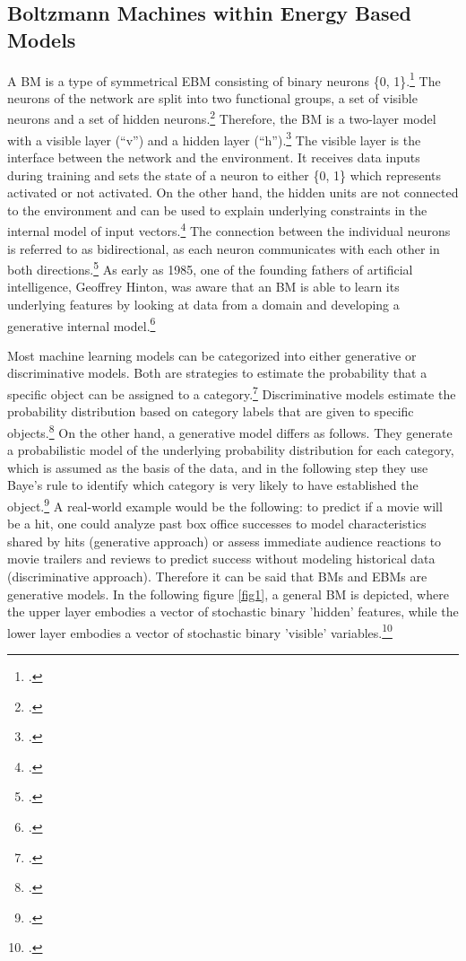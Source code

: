 \subsection{Boltzmann Machines within Energy Based Models}

A \ac{BM} is a type of symmetrical \ac{EBM} consisting of binary neurons \{0, 1\}.\footcite[cf.][260]{amariInformationGeometryBoltzmann1992}
The neurons of the network are split into two functional groups, a set of visible neurons and a set of hidden neurons.\footcite[cf.][154]{ackleyLearningAlgorithmBoltzmann1985}
Therefore, the \ac{BM} is a two-layer model with a visible layer (``v'') and a hidden layer (``h'').\footcite[cf.][448]{salakhutdinovDeepBoltzmannMachines2009}
The visible layer is the interface between the network and the environment. It receives data inputs during training and sets the state of a neuron to either \{0, 1\} which represents activated or not activated.
On the other hand, the hidden units are not connected to the environment and can be used to explain underlying constraints in the internal model of input vectors.\footcite[cf.][154]{ackleyLearningAlgorithmBoltzmann1985}
The connection between the individual neurons is referred to as bidirectional, as each neuron communicates with each other in both directions.\footcite[cf.][149]{ackleyLearningAlgorithmBoltzmann1985}
As early as 1985, one of the founding fathers of artificial intelligence, Geoffrey Hinton, was aware that an \ac{BM} is able to learn its underlying features by looking at data from a domain and developing a generative internal model.\footcite[cf.][148]{ackleyLearningAlgorithmBoltzmann1985}

Most machine learning models can be categorized into either generative or discriminative models. Both are strategies to estimate the probability that a specific object can be assigned to a category.\footcite[cf.][1]{hsuEffectsGenerativeDiscriminative2010}
Discriminative models estimate the probability distribution based on category labels that are given to specific objects.\footcite[cf.][2]{gmComprehensiveSurveyAnalysis2020}
On the other hand, a generative model differs as follows. 
They generate a probabilistic model of the underlying probability distribution for each category, which is assumed as the basis of the data, and in the following step they use Baye's rule to identify which category is very likely to have established the object.\footcite[cf.][1]{hsuEffectsGenerativeDiscriminative2010}
A real-world example would be the following: to predict if a movie will be a hit, one could analyze past box office successes to model characteristics shared by hits (generative approach) or assess immediate audience reactions to movie trailers and reviews to predict success without modeling historical data (discriminative approach).
Therefore it can be said that \ac{BM}s and \ac{EBM}s are generative models. In the following figure \ref{fig1}, a general \ac{BM} is depicted, where the upper layer embodies a vector of stochastic binary 'hidden' features, while the lower layer embodies a vector of stochastic binary 'visible' variables.\footcite[cf.][449]{salakhutdinovDeepBoltzmannMachines2009}

